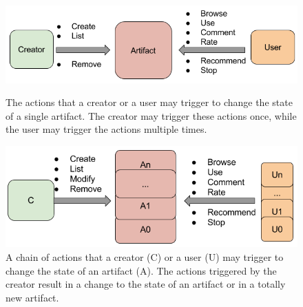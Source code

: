 \begin{figure}[H]
	\includegraphics[scale=0.65]{figures/marketplaces/marketplace_single_artifact.png}
	\caption{The actions that a creator or a user may trigger to change the state of a single artifact. The creator may trigger these actions once, while the user may trigger the actions multiple times.}
	\label{fig:figure_marketplace_actions_single}
	\includegraphics[scale=0.65]{figures/marketplaces/marketplace_multiple_artifacts.png}
	\caption{A chain of actions that a creator (C) or a user (U) may trigger to change the state of an artifact (A). The actions triggered by the creator result in a change to the state of an artifact or in a totally new artifact.}
	\label{fig:figure_marketplace_actions_multiple}
\end{figure}

